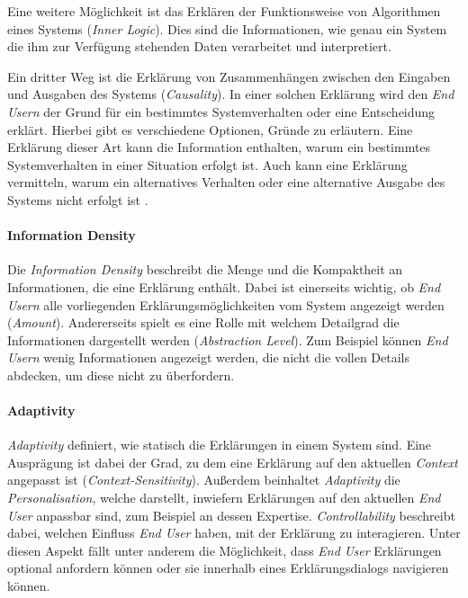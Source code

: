 Eine weitere Möglichkeit ist das Erklären der Funktionsweise von Algorithmen eines Systems (\textit{Inner Logic}). Dies sind die Informationen, wie genau ein System die ihm zur Verfügung stehenden Daten verarbeitet und interpretiert.

Ein dritter Weg ist die Erklärung von Zusammenhängen zwischen den Eingaben und Ausgaben des Systems (\textit{Causality}). In einer solchen Erklärung wird den \textit{End Usern} der Grund für ein bestimmtes Systemverhalten oder eine Entscheidung erklärt. Hierbei gibt es verschiedene Optionen, Gründe zu erläutern. Eine Erklärung dieser Art kann die Information enthalten, warum ein bestimmtes Systemverhalten in einer Situation erfolgt ist. Auch kann eine Erklärung vermitteln, warum ein alternatives Verhalten oder eine alternative Ausgabe des Systems nicht erfolgt ist \cite{martin_evaluating_2021}.

\paragraph{Information Density} Die \textit{Information Density} beschreibt die Menge und die Kompaktheit an Informationen, die eine Erklärung enthält. Dabei ist einerseits wichtig, ob \textit{End Usern} alle vorliegenden Erklärungsmöglichkeiten vom System angezeigt werden (\textit{Amount}). Andererseits spielt es eine Rolle mit welchem Detailgrad die Informationen dargestellt werden (\textit{Abstraction Level}). Zum Beispiel können \textit{End Usern} wenig Informationen angezeigt werden, die nicht die vollen Details abdecken, um diese nicht zu überfordern.

\paragraph{Adaptivity} \textit{Adaptivity} definiert, wie statisch die Erklärungen in einem System sind. Eine Ausprägung ist dabei der Grad, zu dem eine Erklärung auf den aktuellen \textit{Context} angepasst ist (\textit{Context-Sensitivity}). Außerdem beinhaltet \textit{Adaptivity} die \textit{Personalisation}, welche darstellt, inwiefern Erklärungen auf den aktuellen \textit{End User} anpassbar sind, zum Beispiel an dessen Expertise. \textit{Controllability} beschreibt dabei, welchen Einfluss \textit{End User} haben, mit der Erklärung zu interagieren. Unter diesen Aspekt fällt unter anderem die Möglichkeit, dass \textit{End User} Erklärungen optional anfordern können oder sie innerhalb eines Erklärungsdialogs navigieren können.

